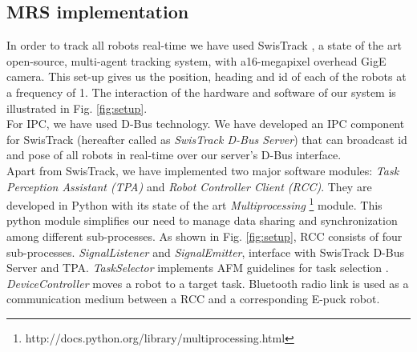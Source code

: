 \subsection{MRS implementation}
In order to track all robots real-time we have used SwisTrack \cite{SwisTrack}, a state of the art open-source, multi-agent tracking system, with a16-megapixel overhead GigE camera. This set-up gives us the position, heading and id of each of the robots at a frequency of 1. The interaction of the hardware and software of our system is illustrated in Fig. \ref{fig:setup}. \\
For IPC, we have used D-Bus technology. %
We have developed an IPC component for SwisTrack (hereafter called as \textit{SwisTrack D-Bus Server}) that can broadcast id and pose of all robots in real-time over our server's D-Bus interface.\\
Apart from SwisTrack, we have implemented two major software modules: {\em Task Perception Assistant (TPA)} and {\em Robot Controller Client (RCC)}. They are developed in Python with its state of the art \textit{Multiprocessing} \footnote{http://docs.python.org/library/multiprocessing.html} module. This python module simplifies our need to manage data sharing and synchronization among different sub-processes. As shown in Fig. \ref{fig:setup}, RCC consists of four sub-processes. {\em SignalListener} and {\em SignalEmitter}, interface with SwisTrack D-Bus Server and TPA. {\em TaskSelector} implements AFM guidelines for task selection . {\em DeviceController} moves a robot to a target task. Bluetooth radio link is used as a communication medium between a RCC and a corresponding E-puck robot. 
%
